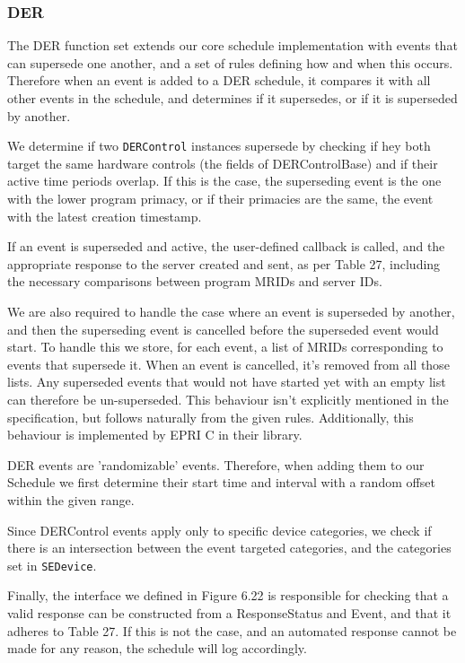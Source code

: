 \subsubsection{DER}
The DER function set extends our core schedule implementation with events that can supersede one another, and a set of rules defining how and when this occurs. Therefore when an event is added to a DER schedule, it compares it with all other events in the schedule, and determines if it supersedes, or if it is superseded by another. 

We determine if two \texttt{DERControl} instances supersede by checking if hey both target the same hardware controls (the fields of DERControlBase) and if their active time periods overlap. If this is the case, the superseding event is the one with the lower program primacy, or if their primacies are the same, the event with the latest creation timestamp.

If an event is superseded and active, the user-defined callback is called, and the appropriate response to the server created and sent, as per Table 27, including the necessary comparisons between program MRIDs and server IDs.

We are also required to handle the case where an event is superseded by another, and then the superseding event is cancelled before the superseded event would start. To handle this we store, for each event, a list of MRIDs corresponding to events that supersede it. When an event is cancelled, it's removed from all those lists. Any superseded events that would not have started yet with an empty list can therefore be un-superseded.
This behaviour isn't explicitly mentioned in the specification, but follows naturally from the given rules. Additionally, this behaviour is implemented by EPRI C in their library.

DER events are 'randomizable' events. Therefore, when adding them to our Schedule we first determine their start time and interval with a random offset within the given range.

Since DERControl events apply only to specific device categories, we check if there is an intersection between the event targeted categories, and the categories set in \texttt{SEDevice}.

Finally, the interface we defined in Figure 6.22 is responsible for checking that a valid response can be constructed from a ResponseStatus and Event, and that it adheres to Table 27. If this is not the case, and an automated response cannot be made for any reason, the schedule will log accordingly.

